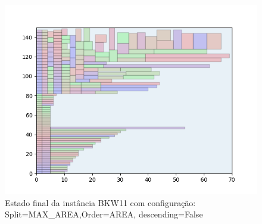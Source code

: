 \begin{figure}[H]
    \centering
    \caption[]{Estado final da instância BKW11 com configuração: Split=MAX_AREA,Order=AREA, descending=False}
    \label{fig:bkw11-max_area-area-false}
    \includegraphics[scale=0.5]{output/figures/bkw/bkw11/max_area/area/false/000}
\end{figure}